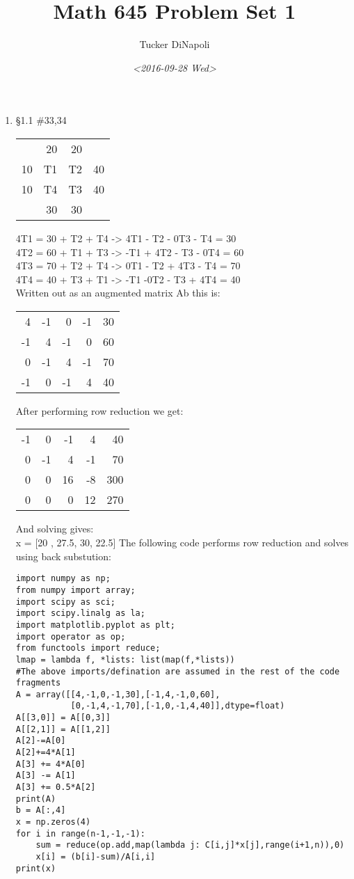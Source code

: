 \documentclass[11pt]{article}
\author{Tucker DiNapoli}
\date{\textit{<2016-09-28 Wed>}}
\title{Math 645 Problem Set 1}
\begin{document}
\maketitle
\begin{enumerate}
\item §1.1 \#33,34
\begin{center}
\begin{tabular}{rrrr}
 & 20 & 20 & \\
10 & T1 & T2 & 40\\
10 & T4 & T3 & 40\\
 & 30 & 30 & \\
\end{tabular}
\end{center}

4T1 = 30 + T2 + T4 -> 4T1 - T2 - 0T3 - T4 = 30\\
4T2 = 60 + T1 + T3 -> -T1 + 4T2 - T3 - 0T4 = 60\\
4T3 = 70 + T2 + T4 -> 0T1 - T2 + 4T3 - T4 = 70\\
4T4 = 40 + T3 + T1 -> -T1 -0T2 - T3 + 4T4 = 40\\

Written out as an augmented matrix Ab this is:
\begin{center}
\begin{tabular}{rrrrr}
4 & -1 & 0 & -1 & 30\\
-1 & 4 & -1 & 0 & 60\\
0 & -1 & 4 & -1 & 70\\
-1 & 0 & -1 & 4 & 40\\
\end{tabular}
\end{center}

After performing row reduction we get:
\begin{center}
\begin{tabular}{rrrrr}
-1 & 0 & -1 & 4 & 40\\
0 & -1 & 4 & -1 & 70\\
0 & 0 & 16 & -8 & 300\\
0 & 0 & 0 & 12 & 270\\
\end{tabular}
\end{center}

And solving gives:\\
x = [20 , 27.5,  30,  22.5]
The following code performs row reduction and solves using back substution:
\begin{verbatim}
import numpy as np;
from numpy import array;
import scipy as sci;
import scipy.linalg as la;
import matplotlib.pyplot as plt;
import operator as op;
from functools import reduce;
lmap = lambda f, *lists: list(map(f,*lists))
#The above imports/defination are assumed in the rest of the code fragments
A = array([[4,-1,0,-1,30],[-1,4,-1,0,60],
           [0,-1,4,-1,70],[-1,0,-1,4,40]],dtype=float)
A[[3,0]] = A[[0,3]]
A[[2,1]] = A[[1,2]]
A[2]-=A[0]
A[2]+=4*A[1]
A[3] += 4*A[0]
A[3] -= A[1]
A[3] += 0.5*A[2]
print(A)
b = A[:,4]
x = np.zeros(4)
for i in range(n-1,-1,-1):
    sum = reduce(op.add,map(lambda j: C[i,j]*x[j],range(i+1,n)),0)
    x[i] = (b[i]-sum)/A[i,i]
print(x)
\end{verbatim}


\end{enumerate}
\end{document}
